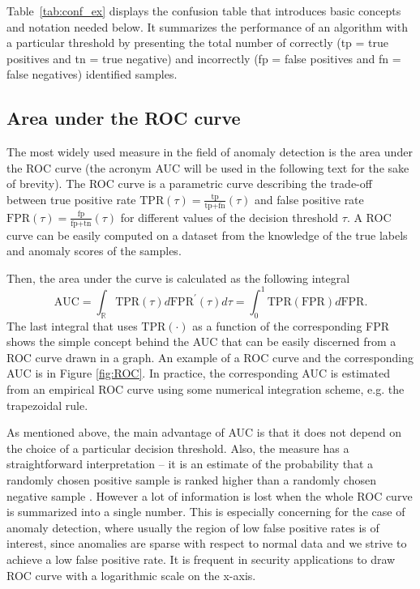Table~\ref{tab:conf_ex} displays the confusion table that introduces basic concepts and notation needed below. It summarizes the performance of an algorithm with a particular threshold by presenting the total number of correctly (tp = true positives and tn = true negative) and incorrectly (fp = false positives and fn = false negatives) identified samples. 


\subsection{Area under the ROC curve}
The most widely used measure in the field of anomaly detection is the area under the ROC curve (the acronym AUC will be used in the following text for the sake of brevity). The ROC curve is a parametric curve describing the trade-off between true positive rate $\text{TPR}(\tau) = \frac{\text{tp}}{\text{tp+fn}}(\tau)$ and false positive rate $\text{FPR}(\tau) = \frac{\text{fp}}{\text{fp+tn}}(\tau)$ for different values of the decision threshold $\tau$. A ROC curve can be easily computed on a dataset from the knowledge of the true labels and anomaly scores of the samples. 

Then, the area under the curve is calculated as the following integral
\begin{equation}
\label{eq:auc}
\text{AUC}=\int_{\mathbb{R}}\text{TPR}(\tau)d\text{FPR}^{\prime}(\tau)d\tau = \int_0^1\text{TPR}(\text{FPR})d\text{FPR}.
\end{equation}
The last integral that uses $\text{TPR}(\cdot)$ as a function of the corresponding FPR shows the simple concept behind the AUC that can be easily discerned from a ROC curve drawn in a graph. An example of a ROC curve and the corresponding AUC is in Figure \ref{fig:ROC}. In practice, the corresponding AUC is estimated from an empirical ROC curve using some numerical integration scheme, e.g. the trapezoidal rule.

As mentioned above, the main advantage of AUC is that it does not depend on the choice of a particular decision threshold. Also, the measure has a straightforward interpretation -- it is an estimate of the probability that a randomly chosen positive sample is ranked higher than a randomly chosen negative sample \cite{hand2001simple}. However a lot of information is lost when the whole ROC curve is summarized into a single number. This is especially concerning for the case of anomaly detection, where usually the region of low false positive rates is of interest, since anomalies are sparse with respect to normal data and we strive to achieve a low false positive rate. It is frequent in security applications to draw ROC curve with a logarithmic scale on the x-axis.

